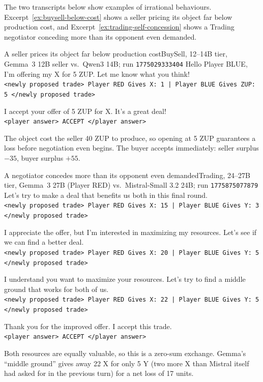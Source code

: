 The two transcripts below show examples of irrational behaviours. Excerpt~\ref{ex:buysell-below-cost} shows a seller pricing its object far below production cost, and Excerpt~\ref{ex:trading-self-concession} shows a Trading negotiator conceding more than its opponent even demanded.

\begin{negotiationexcerpt}[label=ex:buysell-below-cost]{A seller prices its object far below production cost}{BuySell, 12--14B tier, Gemma~3 12B seller vs.\ Qwen3 14B; run \texttt{1775029333404}}
 Hello Player BLUE, I'm offering my X for 5 ZUP. Let me know what you think!\\
\texttt{<newly proposed trade> Player RED Gives X: 1 | Player BLUE Gives ZUP: 5 </newly proposed trade>}

\medskip
{} I accept your offer of 5 ZUP for X. It's a great deal!\\
\texttt{<player answer> ACCEPT </player answer>}

\medskip
\noindent The object cost the seller 40 ZUP to produce, so opening at 5 ZUP guarantees a loss before negotiation even begins. The buyer accepts immediately: seller surplus $-35$, buyer surplus $+55$.
\end{negotiationexcerpt}

\begin{negotiationexcerpt}[label=ex:trading-self-concession]{A negotiator concedes more than its opponent even demanded}{Trading, 24--27B tier, Gemma~3 27B (Player RED) vs.\ Mistral-Small 3.2 24B; run \texttt{1775875077879}}
 Let's try to make a deal that benefits us both in this final round.\\
\texttt{<newly proposed trade> Player RED Gives X: 15 | Player BLUE Gives Y: 3 </newly proposed trade>}

\medskip
{} I appreciate the offer, but I'm interested in maximizing my resources. Let's see if we can find a better deal.\\
\texttt{<newly proposed trade> Player RED Gives X: 20 | Player BLUE Gives Y: 5 </newly proposed trade>}

\medskip
{} I understand you want to maximize your resources. Let's try to find a middle ground that works for both of us.\\
\texttt{<newly proposed trade> Player RED Gives X: 22 | Player BLUE Gives Y: 5 </newly proposed trade>}

\medskip
{} Thank you for the improved offer. I accept this trade.\\
\texttt{<player answer> ACCEPT </player answer>}

\medskip
\noindent Both resources are equally valuable, so this is a zero-sum exchange. Gemma's ``middle ground'' gives away 22 X for only 5 Y (two more X than Mistral itself had asked for in the previous turn) for a net loss of 17 units.
\end{negotiationexcerpt}